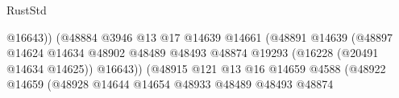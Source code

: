 \begin{lexlean}{RustStd}
\begin{coremodule}
                                                                    @16643))
                                                                (@48884
                                                                  @3946
                                                                  @13
                                                                  @17
                                                                  @14639
                                                                  @14661
                                                                  (@48891
                                                                    @14639
                                                                    (@48897
                                                                      @14624
                                                                      @14634
                                                                      @48902
                                                                      @48489
                                                                      @48493
                                                                      @48874
                                                                      @19293
                                                                      (@16228
                                                                        (@20491 @14634 @14625))
                                                                      @16643))
                                                                  (@48915
                                                                    @121
                                                                    @13
                                                                    @16
                                                                    @14659
                                                                    @4588
                                                                    (@48922
                                                                      @14659
                                                                      (@48928
                                                                        @14644
                                                                        @14654
                                                                        @48933
                                                                        @48489
                                                                        @48493
                                                                        @48874

\end{coremodule}
\end{lexlean}

